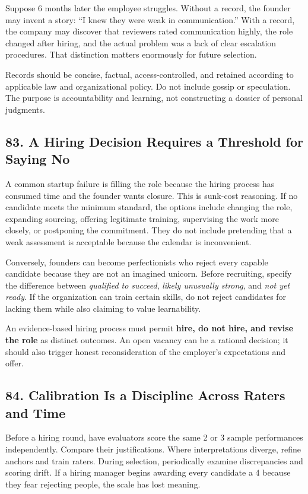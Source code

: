 Suppose 6 months later the employee struggles. Without a record, the founder may invent a story: ``I knew they were weak in communication.'' With a record, the company may discover that reviewers rated communication highly, the role changed after hiring, and the actual problem was a lack of clear escalation procedures. That distinction matters enormously for future selection.

Records should be concise, factual, access-controlled, and retained according to applicable law and organizational policy. Do not include gossip or speculation. The purpose is accountability and learning, not constructing a dossier of personal judgments.

\subsection*{83. A Hiring Decision Requires a Threshold for Saying No}

A common startup failure is filling the role because the hiring process has consumed time and the founder wants closure. This is sunk-cost reasoning. If no candidate meets the minimum standard, the options include changing the role, expanding sourcing, offering legitimate training, supervising the work more closely, or postponing the commitment. They do not include pretending that a weak assessment is acceptable because the calendar is inconvenient.

Conversely, founders can become perfectionists who reject every capable candidate because they are not an imagined unicorn. Before recruiting, specify the difference between \textit{qualified to succeed}, \textit{likely unusually strong}, and \textit{not yet ready}. If the organization can train certain skills, do not reject candidates for lacking them while also claiming to value learnability.

An evidence-based hiring process must permit \textbf{hire, do not hire, and revise the role} as distinct outcomes. An open vacancy can be a rational decision; it should also trigger honest reconsideration of the employer's expectations and offer.

\subsection*{84. Calibration Is a Discipline Across Raters and Time}

Before a hiring round, have evaluators score the same 2 or 3 sample performances independently. Compare their justifications. Where interpretations diverge, refine anchors and train raters. During selection, periodically examine discrepancies and scoring drift. If a hiring manager begins awarding every candidate a 4 because they fear rejecting people, the scale has lost meaning.

